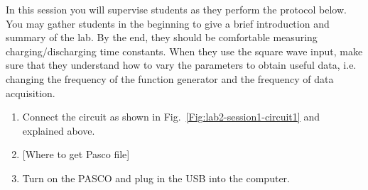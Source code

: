 \documentclass[12pt]{report}
\def\anhkhoi#1{{\color{purple}[#1]}}
\begin{document}
\begin{tcolorbox}[title=Session \#1]
In this session you will supervise students as they perform the protocol below. You may gather students in the beginning to give a brief introduction and summary of the lab. 
By the end, they should be comfortable measuring charging/discharging time constants. 
When they use the square wave input, make sure that they understand how to vary the parameters to obtain useful data, i.e. changing the frequency of the function generator and the frequency of data acquisition.
\end{tcolorbox}

\begin{enumerate}
\item Connect the circuit as shown in Fig.~\ref{Fig:lab2-session1-circuit1} and explained above.
\item \anhkhoi{Where to get Pasco file}
\item Turn on the PASCO and plug in the USB into the computer.


\end{enumerate}
\end{document}
